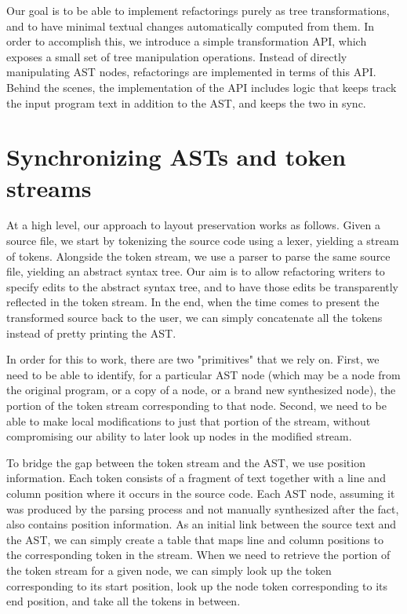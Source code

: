 Our goal is to be able to implement refactorings purely as tree
transformations, and to have minimal textual changes automatically computed
from them. In order to accomplish this, we introduce a simple transformation
API, which exposes a small set of tree manipulation operations. Instead of
directly manipulating AST nodes, refactorings are implemented in terms of this
API. Behind the scenes, the implementation of the API includes logic that keeps
track the input program text in addition to the AST, and keeps the two in sync.

\section{Synchronizing ASTs and token streams}

At a high level, our approach to layout preservation works as follows. Given a
\matlab source file, we start by tokenizing the source code using a \matlab
lexer, yielding a stream of tokens. Alongside the token stream, we use a
\matlab parser to parse the same source file, yielding an abstract syntax tree.
Our aim is to allow refactoring writers to specify edits to the abstract syntax
tree, and to have those edits be transparently reflected in the token stream.
In the end, when the time comes to present the transformed source back to the
user, we can simply concatenate all the tokens instead of pretty printing the
AST.

In order for this to work, there are two "primitives" that we rely on. First,
we need to be able to identify, for a particular AST node (which may be a node
from the original program, or a copy of a node, or a brand new synthesized
node), the portion of the token stream corresponding to that node. Second, we
need to be able to make local modifications to just that portion of the stream,
without compromising our ability to later look up nodes in the modified stream.

To bridge the gap between the token stream and the AST, we use position
information. Each token consists of a fragment of text together with a line and
column position where it occurs in the source code. Each AST node, assuming it
was produced by the parsing process and not manually synthesized after the
fact, also contains position information. As an initial link between the source
text and the AST, we can simply create a table that maps line and column
positions to the corresponding token in the stream. When we need to retrieve
the portion of the token stream for a given node, we can simply look up the
token corresponding to its start position, look up the node token corresponding
to its end position, and take all the tokens in between.

